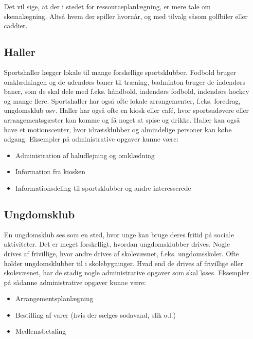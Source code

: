 Det vil sige, at der i stedet for ressourceplanlægning, er mere tale om skemalægning. Altså hvem der spiller
hvornår, og med tilvalg såsom golfbiler eller caddier.


\subsection{Haller}

Sportshaller lægger lokale til mange forskellige sportsklubber. Fodbold bruger omklædningen og de
udendørs baner til træning, badminton bruger de indendørs baner, som de skal dele med f.eks. håndbold,
indendørs fodbold, indendørs hockey og mange flere. Sportshaller har også ofte lokale arrangementer, f.eks.
foredrag, ungdomsklub osv. Haller har også ofte en kiosk eller café, hvor sportsudøvere eller
arrangementsgæster kan komme og få noget at spise og drikke. Haller kan også have et motionscenter, hvor
idrætsklubber og almindelige personer kan købe adgang\citep{spt_hal}. Eksempler på administrative opgaver
kunne være:

\begin{itemize}
  \item Administration af haludlejning og omklædning 
  \item Information fra kiosken
  \item Informationsdeling til sportsklubber og andre interesserede
\end{itemize}


\subsection{Ungdomsklub}

En ungdomsklub ses som en sted, hvor unge kan bruge deres fritid på sociale aktiviteter. Det er meget
forskelligt, hvordan ungdomsklubber drives. Nogle drives af frivillige, hvor andre drives af skolevæsnet,
f.eks. ungdomsskoler. Ofte holder ungdomsklubber til i skolebygninger. Hvad end de drives af frivillige eller
skolevæsnet, har de stadig nogle administrative opgaver som skal løses. Eksempler på sådanne administrative
opgaver kunne være:

\begin{itemize}
  \item Arrangementsplanlægning
  \item Bestilling af varer (hvis der sælges sodavand, slik o.l.)
  \item Medlemsbetaling
\end{itemize}


